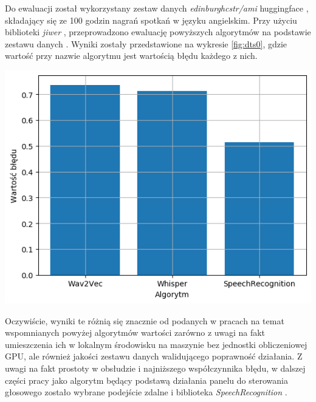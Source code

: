 Do ewaluacji został wykorzystany zestaw danych \textit{edinburghcstr/ami} huggingface \cite{dataset-eval}, składający się ze 100 godzin nagrań spotkań w języku angielskim. Przy użyciu biblioteki \textit{jiwer} \cite{jiwer}, przeprowadzono ewaluację powyższych algorytmów na podstawie zestawu danych \cite{dataset-eval}. Wyniki zostały przedstawione na wykresie \ref{fig:dts0}, gdzie wartość przy nazwie algorytmu jest wartością błędu każdego z nich.
\begin{center}
    \includegraphics[width=0.7\linewidth]{files/output0.png}
    \label{fig:dts0}
\end{center}

Oczywiście, wyniki te różnią się znacznie od podanych w pracach na temat wspomnianych powyżej algorytmów wartości zarówno z uwagi na fakt umieszczenia ich w lokalnym środowisku na maszynie bez jednostki obliczeniowej GPU, ale również jakości zestawu danych walidującego poprawność działania. Z uwagi na fakt prostoty w obsłudzie i najniższego współczynnika błędu, w dalszej części pracy jako algorytm będący podstawą działania panelu do sterowania głosowego zostało wybrane podejście zdalne i biblioteka \textit{SpeechRecognition} \cite{speechrec}.